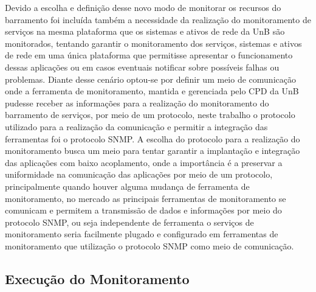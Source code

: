 Devido a escolha e definição desse novo modo de monitorar os recursos do barramento foi incluída também a necessidade da realização do monitoramento de serviços na mesma plataforma que os sistemas e ativos de rede da \acrshort{UnB} são monitorados, tentando garantir o monitoramento dos serviços, sistemas e ativos de rede em uma única plataforma que permitisse apresentar o funcionamento dessas aplicações ou em casos eventuais notificar sobre possíveis falhas ou problemas. Diante desse cenário optou-se por definir um meio de comunicação onde a ferramenta de monitoramento, mantida e gerenciada pelo \acrshort{CPD} da \acrshort{UnB} pudesse receber as informações para a realização do monitoramento do barramento de serviços, por meio de um protocolo, neste trabalho o protocolo utilizado para a realização da comunicação e permitir a integração das ferramentas foi o protocolo \acrshort{SNMP}. A escolha do protocolo para a realização do monitoramento busca um meio para tentar garantir a implantação e integração das aplicações com baixo acoplamento, onde a importância é a preservar a uniformidade na comunicação das aplicações por meio de um protocolo, principalmente quando houver alguma mudança de ferramenta de monitoramento, no mercado as principais ferramentas de monitoramento se comunicam e permitem a transmissão de dados e informações por meio do protocolo \acrshort{SNMP}, ou seja independente de ferramenta o serviços de monitoramento seria facilmente plugado e configurado em ferramentas de monitoramento que utilização o protocolo \acrshort{SNMP} como meio de comunicação.      





\subsection{Execução do Monitoramento}

